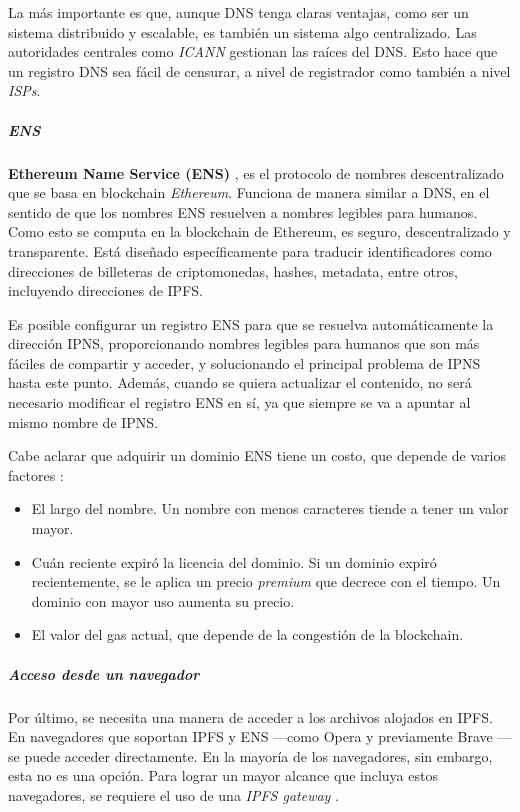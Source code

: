 La más importante es que, aunque DNS tenga claras ventajas, como ser un sistema distribuido y escalable, es también un sistema algo centralizado. Las autoridades centrales como \textit{ICANN} gestionan las raíces del DNS. Esto hace que un registro DNS sea fácil de censurar, a nivel de registrador como también a nivel \textit{ISPs}.

\subparagraph{ENS}

\textbf{Ethereum Name Service (ENS)} \cite{ens}, es el protocolo de nombres descentralizado que se basa en blockchain \textit{Ethereum}. Funciona de manera similar a DNS, en el sentido de que los nombres ENS resuelven a nombres legibles para humanos. Como esto se computa en la blockchain de Ethereum, es seguro, descentralizado y transparente. Está diseñado específicamente para traducir identificadores como direcciones de billeteras de criptomonedas, hashes, metadata, entre otros, incluyendo direcciones de IPFS.

Es posible configurar un registro ENS para que se resuelva automáticamente la dirección IPNS, proporcionando nombres legibles para humanos que son más fáciles de compartir y acceder, y solucionando el principal problema de IPNS hasta este punto. Además, cuando se quiera actualizar el contenido, no será necesario modificar el registro ENS en sí, ya que siempre se va a apuntar al mismo nombre de IPNS.

Cabe aclarar que adquirir un dominio ENS tiene un costo, que depende de varios factores \cite{ens-price}:
\begin{itemize}
    \item El largo del nombre. Un nombre con menos caracteres tiende a tener un valor mayor.
    \item Cuán reciente expiró la licencia del dominio. Si un dominio expiró recientemente, se le aplica un precio \textit{premium} que decrece con el tiempo. Un dominio con mayor uso aumenta su precio.
    \item El valor del gas actual, que depende de la congestión de la blockchain.
\end{itemize}

\subparagraph{Acceso desde un navegador}

Por último, se necesita una manera de acceder a los archivos alojados en IPFS. En navegadores que soportan IPFS y ENS —como Opera \cite{opera-ipfs} y previamente Brave \cite{brave-ipfs}— se puede acceder directamente. En la mayoría de los navegadores, sin embargo, esta no es una opción. Para lograr un mayor alcance que incluya estos navegadores, se requiere el uso de una \textit{IPFS gateway} \cite{ipfs-gateway}.

